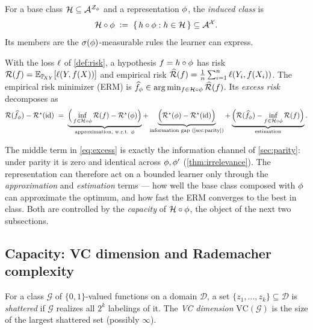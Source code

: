 \begin{definition}
\label{def:induced-class}
For a base class $\mathcal{H} \subseteq \mathcal{A}^{\mathcal{Z}_{\phi}}$ and a
representation $\phi$, the \emph{induced class} is
\[
  \mathcal{H} \circ \phi \;\vcentcolon=\;
  \{\, h \circ \phi : h \in \mathcal{H} \,\} \subseteq \mathcal{A}^{\mathcal{X}}.
\]
Its members are the $\sigma\!\left(\phi\right)$-measurable rules the learner can express.
\end{definition}

\begin{definition}
\label{def:emp-risk}
With the loss $\ell$ of \cref{def:risk}, a hypothesis
$f = h\circ\phi$ has risk $\mathcal{R}(f) = \mathbb{E}_{\mathbb{P}_{\!XY}}[\ell(Y,f(X))]$ and
empirical risk
$\widehat{\mathcal{R}}(f) = \tfrac1{n}\sum_{i=1}^{n}\ell(Y_i,f(X_i))$. The
empirical risk minimizer (ERM) is
$\widehat{f}_{\phi} \in \arg\min_{f\in\mathcal{H}\circ\phi}\widehat{\mathcal{R}}(f)$. Its
\emph{excess risk} decomposes as
\begin{equation}
  \label{eq:excess}
  \risk(\widehat{f}_{\rep}) - \bayesrisk(\mathrm{id})
  \;=\;
  \underbrace{\Big(\inf_{f\in\hypclass\circ\rep}\risk(f) - \bayesrisk(\rep)\Big)}_{\text{approximation, w.r.t. }\rep}
  + \underbrace{\Big(\bayesrisk(\rep)-\bayesrisk(\mathrm{id})\Big)}_{\text{information gap (\cref{sec:parity})}}
  + \underbrace{\Big(\risk(\widehat{f}_{\rep}) - \inf_{f\in\hypclass\circ\rep}\risk(f)\Big)}_{\text{estimation}}.
\end{equation}
\end{definition}

The middle term in \eqref{eq:excess} is exactly the information channel of
\cref{sec:parity}: under parity it is zero and identical across $\phi,\phi'$
(\cref{thm:irrelevance}). The representation can therefore act on a bounded
learner only through the \emph{approximation} and \emph{estimation} terms ---
how well the base class composed with $\phi$ can approximate the optimum, and
how fast the ERM converges to the best in class. Both are controlled by the
\emph{capacity} of $\mathcal{H}\circ\phi$, the object of the next two
subsections.

\subsection{Capacity: VC dimension and Rademacher complexity}
\label{subsec:capacity}

\begin{definition}[VC dimension]
\label{def:vc}
For a class $\mathcal{G}$ of $\{0,1\}$-valued functions on a domain
$\mathcal{D}$, a set $\{z_1,\dots,z_k\}\subseteq\mathcal{D}$ is
\emph{shattered} if $\mathcal{G}$ realizes all $2^k$ labelings of it. The
\emph{VC dimension} $\mathrm{VC}(\mathcal{G})$ is the size of the largest
shattered set (possibly $\infty$).
\end{definition}

